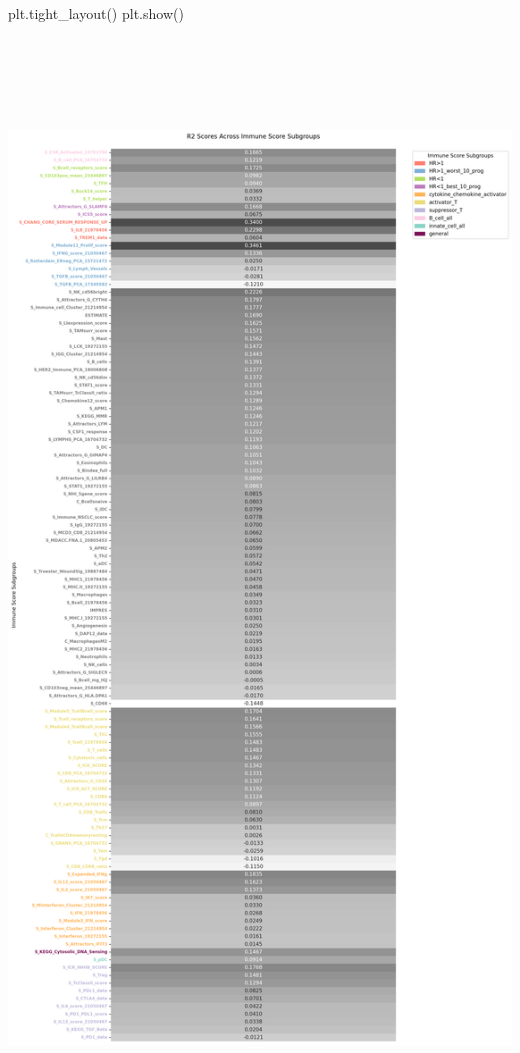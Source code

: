 \documentclass[
  letterpaper,
  DIV=11,
  numbers=noendperiod]{scrartcl}
\newenvironment{Shaded}{\begin{snugshade}}{\end{snugshade}}
\newcommand{\NormalTok}[1]{\textcolor[rgb]{0.00,0.23,0.31}{#1}}
\begin{document}
\begin{Shaded}
\begin{Highlighting}[]
\NormalTok{plt.tight\_layout()}
\NormalTok{plt.show()}
\end{Highlighting}
\end{Shaded}

\includegraphics[width=14.3125in,height=25.94792in]{xgboost_tuned_files/figure-pdf/cell-47-output-1.png}
\end{document}
